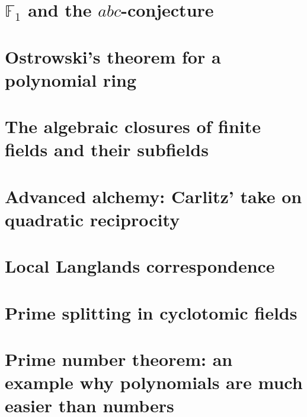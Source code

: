 \documentclass[a4paper]{memoir}
\begin{document}
\section{\texorpdfstring{$\mathbb{F}_1$}{F\_un} and the \texorpdfstring{$abc$}{abc}-conjecture}


\section{Ostrowski's theorem for a polynomial ring}


\section{The algebraic closures of finite fields and their subfields}


\section{Advanced alchemy: Carlitz' take on quadratic reciprocity}


\section{Local Langlands correspondence}


\section{Prime splitting in cyclotomic fields}


\section{Prime number theorem: an example why polynomials are much easier than numbers}




\end{document}
